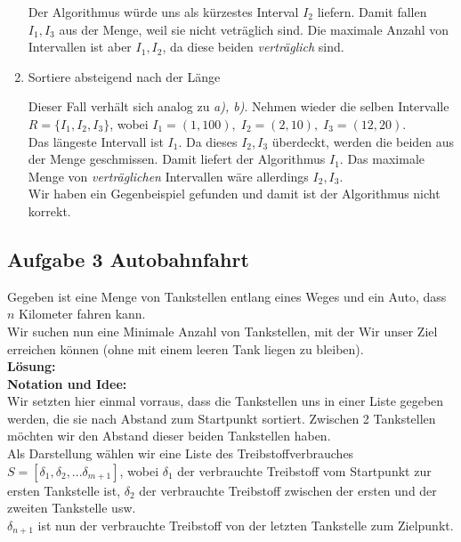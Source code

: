 \documentclass[11pt,a4paper,ngerman]{article}
\begin{document}
\begin{enumerate}[\bfseries (a)]
Der Algorithmus würde uns als kürzestes Interval $I_2$ liefern. Damit fallen $I_1, I_3$ aus der Menge, weil sie nicht veträglich sind. Die maximale Anzahl von Intervallen ist aber $I_1, I_2$, da diese beiden \emph{verträglich} sind.


\item Sortiere absteigend nach der Länge

Dieser Fall verhält sich analog zu \emph{a), b)}. Nehmen wieder die selben Intervalle $R = \{ I_1, I_2, I_3 \}$, wobei $I_1 = (1, 100), \; I_2 = (2, 10), \; I_3 = (12 , 20)$.\\

Das längeste Intervall ist $I_1$. Da dieses $I_2, I_3$ überdeckt, werden die beiden aus der Menge geschmissen. Damit liefert der Algorithmus $I_1$. Das maximale Menge von \emph{verträglichen} Intervallen wäre allerdings $I_2, I_3$.\\

Wir haben ein Gegenbeispiel gefunden und damit ist der Algorithmus nicht korrekt.

\end{enumerate}


\subsection*{Aufgabe 3 \mdseries Autobahnfahrt}

Gegeben ist eine Menge von Tankstellen entlang eines Weges und ein Auto, dass $n$ Kilometer fahren kann.\\
Wir suchen nun eine Minimale Anzahl von Tankstellen, mit der Wir unser Ziel erreichen können (ohne mit einem leeren Tank liegen zu bleiben).\\

\textbf{Lösung:}\\

\textbf{Notation und Idee:}\\
Wir setzten hier einmal vorraus, dass die Tankstellen uns in einer Liste gegeben werden, die sie nach Abstand zum Startpunkt sortiert. Zwischen 2 Tankstellen möchten wir den Abstand dieser beiden Tankstellen haben.\\

Als Darstellung wählen wir eine Liste des Treibstoffverbrauches $S = [\delta_1 , \delta_2 , ... \delta_{m+1}]$, wobei $\delta_1$ der verbrauchte Treibstoff vom Startpunkt zur ersten Tankstelle ist, $\delta_2$ der verbrauchte Treibstoff zwischen der ersten und der zweiten Tankstelle usw.\\
$\delta_{n+1}$ ist nun der verbrauchte Treibstoff von der letzten Tankstelle zum Zielpunkt.\\
\end{document}

